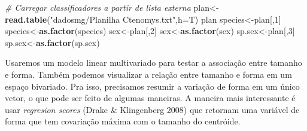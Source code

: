 \documentclass[
]{book}
\newenvironment{Shaded}{\begin{snugshade}}{\end{snugshade}}
\newcommand{\AttributeTok}[1]{\textcolor[rgb]{0.13,0.29,0.53}{#1}}
\newcommand{\CommentTok}[1]{\textcolor[rgb]{0.56,0.35,0.01}{\textit{#1}}}
\newcommand{\DecValTok}[1]{\textcolor[rgb]{0.00,0.00,0.81}{#1}}
\newcommand{\FunctionTok}[1]{\textcolor[rgb]{0.13,0.29,0.53}{\textbf{#1}}}
\newcommand{\NormalTok}[1]{#1}
\newcommand{\OtherTok}[1]{\textcolor[rgb]{0.56,0.35,0.01}{#1}}
\newcommand{\StringTok}[1]{\textcolor[rgb]{0.31,0.60,0.02}{#1}}
\begin{document}
\begin{Shaded}
\begin{Highlighting}[]
\CommentTok{\# Carregar classificadores a partir de lista externa}
\NormalTok{plan}\OtherTok{\textless{}{-}}\FunctionTok{read.table}\NormalTok{(}\StringTok{"dadosmg/Planilha Ctenomys.txt"}\NormalTok{,}\AttributeTok{h=}\NormalTok{T)}
\NormalTok{plan}
\NormalTok{species}\OtherTok{\textless{}{-}}\NormalTok{plan[,}\DecValTok{1}\NormalTok{]}
\NormalTok{species}\OtherTok{\textless{}{-}}\FunctionTok{as.factor}\NormalTok{(species)}
\NormalTok{sex}\OtherTok{\textless{}{-}}\NormalTok{plan[,}\DecValTok{2}\NormalTok{]}
\NormalTok{sex}\OtherTok{\textless{}{-}}\FunctionTok{as.factor}\NormalTok{(sex)}
\NormalTok{sp.sex}\OtherTok{\textless{}{-}}\NormalTok{plan[,}\DecValTok{3}\NormalTok{]}
\NormalTok{sp.sex}\OtherTok{\textless{}{-}}\FunctionTok{as.factor}\NormalTok{(sp.sex)}
\end{Highlighting}
\end{Shaded}

Usaremos um modelo linear multivariado para testar a associação entre tamanho e forma. Também podemos visualizar a relação entre tamanho e forma em um espaço bivariado. Pra isso, precisamos resumir a variação de forma em um único vetor, o que pode ser feito de algumas maneiras. A maneira mais interessante é usar \emph{regresion scores} (Drake \& Klingenberg 2008) que retornam uma variável de forma que tem covariação máxima com o tamanho do centróide.
\end{document}
